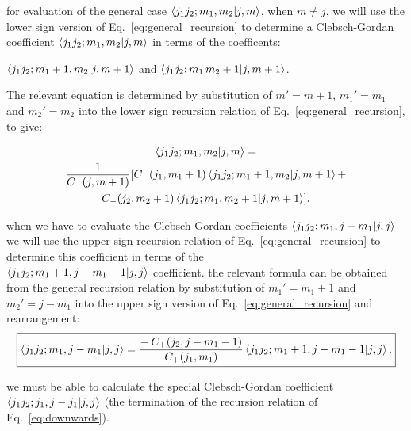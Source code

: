 \documentclass[11pt]{article}
\begin{document}
\begin{outline}
\1 for evaluation of the general case $\braket{j_1j_2;m_1,m_2|j,m}$, when $m \ne j$, we will use the lower sign version of Eq.~\ref{eq:general_recursion} to determine a Clebsch-Gordan coefficient $\braket{j_1j_2;m_1,m_2|j,m}$ in terms of the coefficents: 
\begin{center}
$\braket{j_1j_2;m_1+1,m_2|j,m+1}$
and
$\braket{j_1j_2;m_1\,m_2+1|j,m+1}$.  
\end{center}
The relevant equation is determined by substitution of 
$m'=m+1$,
$m_1'=m_1 $ and 
$m_2'=m_2 $
into the lower sign recursion relation of Eq.~\ref{eq:general_recursion}, to give:
\begin{mdframed}[style=MyFrame]
\begin{multline}
\braket{j_1j_2;m_1,m_2|j,m} = \\
\frac{1}{C_-(j,m+1)}
[
C_-(j_1,m_1+1) \braket{j_1j_2;m_1+1,m_2|j,m+1}
+ \\
C_-(j_2,m_2+1) \braket{j_1j_2;m_1,m_2+1|j,m+1}
].
\end{multline} \end{mdframed}
\1 when we have to evaluate the Clebsch-Gordan coefficients 
$\braket{j_1j_2;m_1,j-m_1|j,j}$ we will use the upper sign recursion relation
of Eq.~\ref{eq:general_recursion} to determine this coefficient in terms of the \\
$\braket{j_1j_2;m_1+1,j-m_1-1|j,j}$ coefficient.
\1 the relevant formula can be obtained from the general recursion relation
by substitution of $m_1'=m_1+1$ and $m_2'=j-m_1$ into the upper sign version of Eq.~\ref{eq:general_recursion} and rearrangement:
\begin{equation}
\boxed{
\braket{j_1j_2;m_1,j-m_1|j,j} 
= \frac{- \: C_+(j_2,j-m_1-1)}{C_+(j_1,m_1)} \braket{j_1j_2;m_1+1,j-m_1-1|j,j}.
}
\label{eq:downwards}
\end{equation}

\1 we must be able to calculate the special Clebsch-Gordan coefficient 
$\braket{j_1j_2;j_1,j-j_1|j,j}$
(the termination of the recursion relation of Eq.~\ref{eq:downwards}).


\end{outline}
\end{document}
